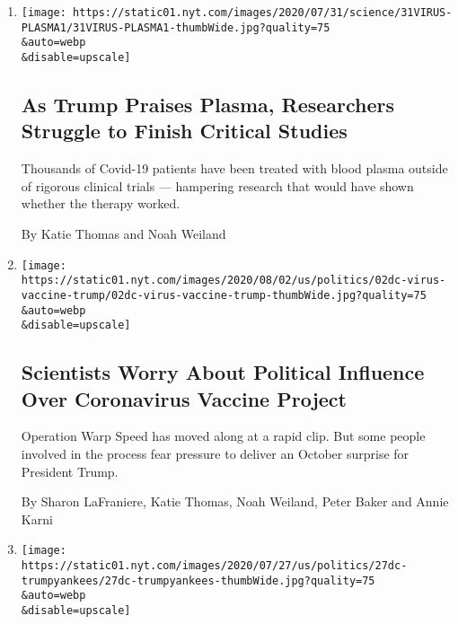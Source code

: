 \begin{enumerate}
\def\labelenumi{\arabic{enumi}.}
\item
  \href{/2020/08/04/health/trump-plasma.html}{}

  \texttt{[image: https://static01.nyt.com/images/2020/07/31/science/31VIRUS-PLASMA1/31VIRUS-PLASMA1-thumbWide.jpg?quality=75\\\&auto=webp\\\&disable=upscale]}

  \hypertarget{as-trump-praises-plasma-researchers-struggle-to-finish-critical-studies}{%
  \subsection{As Trump Praises Plasma, Researchers Struggle to Finish
  Critical
  Studies}\label{as-trump-praises-plasma-researchers-struggle-to-finish-critical-studies}}

  Thousands of Covid-19 patients have been treated with blood plasma
  outside of rigorous clinical trials --- hampering research that would
  have shown whether the therapy worked.

  By Katie Thomas and Noah Weiland
\item
  \href{/2020/08/02/us/politics/coronavirus-vaccine.html}{}

  \texttt{[image: https://static01.nyt.com/images/2020/08/02/us/politics/02dc-virus-vaccine-trump/02dc-virus-vaccine-trump-thumbWide.jpg?quality=75\\\&auto=webp\\\&disable=upscale]}

  \hypertarget{scientists-worry-about-political-influence-over-coronavirus-vaccine-project}{%
  \subsection{Scientists Worry About Political Influence Over
  Coronavirus Vaccine
  Project}\label{scientists-worry-about-political-influence-over-coronavirus-vaccine-project}}

  Operation Warp Speed has moved along at a rapid clip. But some people
  involved in the process fear pressure to deliver an October surprise
  for President Trump.

  By Sharon LaFraniere, Katie Thomas, Noah Weiland, Peter Baker and
  Annie Karni
\item
  \href{/2020/07/27/us/politics/trump-yankees-fauci.html}{}

  \texttt{[image: https://static01.nyt.com/images/2020/07/27/us/politics/27dc-trumpyankees/27dc-trumpyankees-thumbWide.jpg?quality=75\\\&auto=webp\\\&disable=upscale]}


\end{enumerate}
